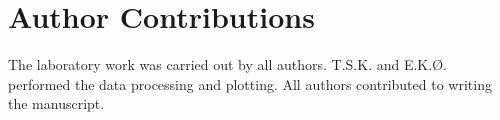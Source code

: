 \section{Author Contributions}

The laboratory work was carried out by all authors. T.S.K. and E.K.Ø. performed the data processing and plotting. All authors contributed to writing the manuscript.